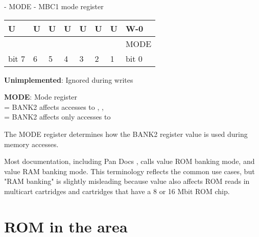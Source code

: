 \begin{register}
  \caption{ - MODE - MBC1 mode register}

  {
    \ttfamily
    \begin{tabularx}{\textwidth}{|X|X|X|X|X|X|X|X|}
      \hline
      U                     & U                     & U                     & U                           & U & U & U & W-0   \\
      \hline
      \cellcolor{LightGray} & \cellcolor{LightGray} & \cellcolor{LightGray} & \cellcolor{LightGray} & \cellcolor{LightGray} & \cellcolor{LightGray} & \cellcolor{LightGray} & MODE \\
      \hline
      bit 7                 & 6                     & 5                     & 4                              & 3   & 2   & 1   & bit 0 \\
      \hline
    \end{tabularx}
  }

  \begin{description}[leftmargin=5em, style=nextline]
    \item[bit 7-1]
      \textbf{Unimplemented}: Ignored during writes
    \item[bit 0]
      \textbf{MODE}: Mode register \\
      = BANK2 affects accesses to , ,  \\
      = BANK2 affects only accesses to  \\
  \end{description}
\end{register}

The MODE register determines how the BANK2 register value is used during memory
accesses.

\begin{warning}
  Most documentation, including Pan Docs \cite{pandocs}, calls value 
  ROM banking mode, and value  RAM banking mode. This terminology
  reflects the common use cases, but "RAM banking" is slightly misleading because
  value  also affects ROM reads in multicart cartridges and cartridges
  that have a 8 or 16 Mbit ROM chip.
\end{warning}

\section{ROM in the  area}

